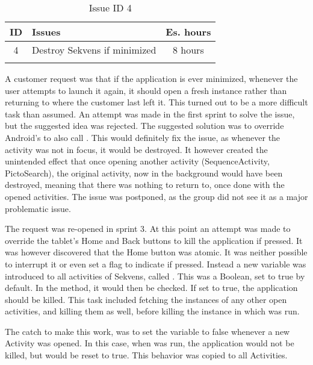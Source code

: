 \begin{longtable} { | c | p{12cm} | c | } 
\hline
	ID 	&	Issues	&		 Es. hours \\\hline
	4 	&	Destroy Sekvens if minimized	&	8 hours \\\hline
\caption{Issue ID 4}
\label{tab:spr3_homebuttonshoulddestroy}
\end{longtable}

A customer request was that if the application is ever minimized, whenever the user attempts to launch it again, it should open a fresh instance rather than returning to where the customer last left it. This turned out to be a more difficult task than assumed. An attempt was made in the first sprint to solve the issue, but the suggested idea was rejected. The suggested solution was to override Android's  to also call . This would definitely fix the issue, as whenever the activity was not in focus, it would be destroyed. It however created the unintended effect that once opening another activity (SequenceActivity, PictoSearch), the original activity, now in the background would have been destroyed, meaning that there was nothing to return to, once done with the opened activities. The issue was postponed, as the group did not see it as a major problematic issue.

The request was re-opened in sprint 3. At this point an attempt was made to override the tablet's Home and Back buttons to kill the application if pressed. It was however discovered that the Home button was atomic. It was neither possible to interrupt it or even set a flag to indicate if pressed. Instead a new variable was introduced to all activities of Sekvens, called . This was a Boolean, set to true by default. In the  method, it would then be checked. If set to true, the application should be killed. This task included fetching the instances of any other open activities, and killing them as well, before killing the instance in which  was run.

The catch to make this work, was to set the variable to false whenever a new Activity was opened. In this case, when  was run, the application would not be killed, but  would be reset to true. This behavior was copied to all Activities.